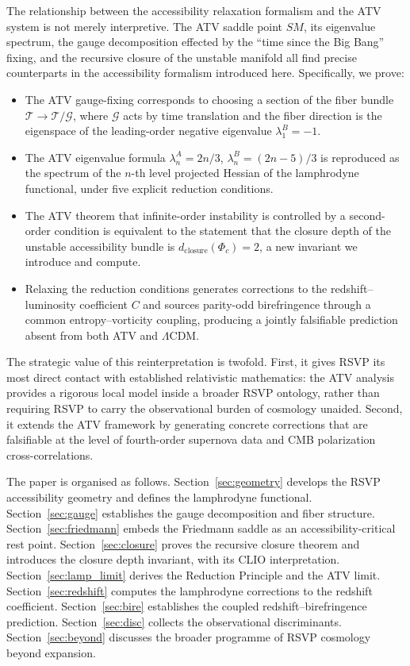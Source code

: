 \documentclass[12pt,a4paper]{article}
\theoremstyle{plain}
\theoremstyle{definition}
\theoremstyle{remark}
\newcommand{\Phic}{\Phi_c}
\newcommand{\Tacc}{\mathcal{T}}
\newcommand{\Ggroup}{\mathcal{G}}
\newcommand{\SM}{\mathit{SM}}
\newcommand{\dclos}{d_{\mathrm{closure}}}
\newcommand{\lAn}[1]{\lambda^A_{#1}}
\newcommand{\lBn}[1]{\lambda^B_{#1}}
\begin{document}
The relationship between the accessibility relaxation formalism and the ATV system
is not merely interpretive. The ATV saddle point $\SM$, its eigenvalue spectrum,
the gauge decomposition effected by the ``time since the Big Bang'' fixing, and
the recursive closure of the unstable manifold all find precise counterparts in
the accessibility formalism introduced here. Specifically, we prove:

\begin{itemize}[leftmargin=1.5em]
\item The ATV gauge-fixing corresponds to choosing a section of the fiber bundle
  $\Tacc \to \Tacc/\Ggroup$, where $\Ggroup$ acts by time translation and the
  fiber direction is the eigenspace of the leading-order negative eigenvalue
  $\lBn{1} = -1$.

\item The ATV eigenvalue formula $\lAn{n} = 2n/3$, $\lBn{n} = (2n-5)/3$ is
  reproduced as the spectrum of the $n$-th level projected Hessian of the
  lamphrodyne functional, under five explicit reduction conditions.

\item The ATV theorem that infinite-order instability is controlled by a second-order
  condition is equivalent to the statement that the closure depth of the
  unstable accessibility bundle is $\dclos(\Phic) = 2$, a new invariant we
  introduce and compute.

\item Relaxing the reduction conditions generates corrections to the
  redshift--luminosity coefficient $C$ and sources parity-odd birefringence through
  a common entropy--vorticity coupling, producing a jointly falsifiable prediction
  absent from both ATV and $\Lambda$CDM.
\end{itemize}

The strategic value of this reinterpretation is twofold. First, it gives RSVP its
most direct contact with established relativistic mathematics: the ATV analysis
provides a rigorous local model inside a broader RSVP ontology, rather than
requiring RSVP to carry the observational burden of cosmology unaided. Second, it
extends the ATV framework by generating concrete corrections that are falsifiable
at the level of fourth-order supernova data and CMB polarization cross-correlations.

The paper is organised as follows. Section~\ref{sec:geometry} develops the RSVP
accessibility geometry and defines the lamphrodyne functional. Section~\ref{sec:gauge}
establishes the gauge decomposition and fiber structure. Section~\ref{sec:friedmann}
embeds the Friedmann saddle as an accessibility-critical rest point.
Section~\ref{sec:closure} proves the recursive closure theorem and introduces
the closure depth invariant, with its CLIO interpretation. Section~\ref{sec:lamp_limit}
derives the Reduction Principle and the ATV limit. Section~\ref{sec:redshift}
computes the lamphrodyne corrections to the redshift coefficient.
Section~\ref{sec:bire} establishes the coupled redshift--birefringence prediction.
Section~\ref{sec:disc} collects the observational discriminants. Section~\ref{sec:beyond}
discusses the broader programme of RSVP cosmology beyond expansion.
\end{document}
